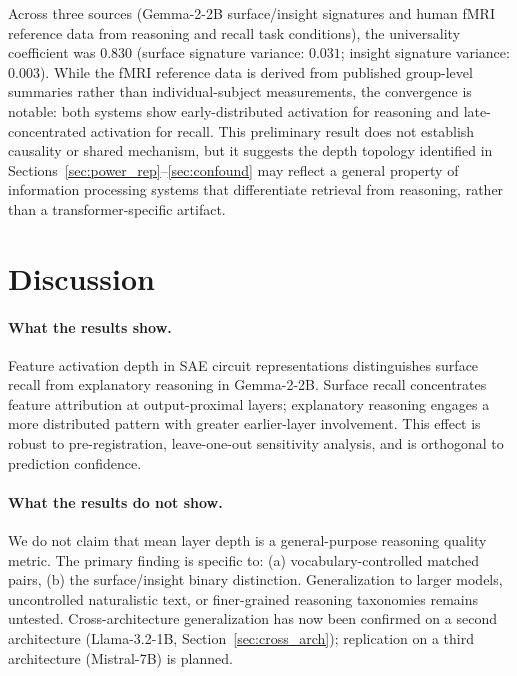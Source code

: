 \documentclass[10pt]{article}
\begin{document}
Across three sources (Gemma-2-2B surface/insight signatures and human fMRI reference data from reasoning and recall task conditions), the universality coefficient was $0.830$ (surface signature variance: $0.031$; insight signature variance: $0.003$). While the fMRI reference data is derived from published group-level summaries rather than individual-subject measurements, the convergence is notable: both systems show early-distributed activation for reasoning and late-concentrated activation for recall. This preliminary result does not establish causality or shared mechanism, but it suggests the depth topology identified in Sections~\ref{sec:power_rep}--\ref{sec:confound} may reflect a general property of information processing systems that differentiate retrieval from reasoning, rather than a transformer-specific artifact.

\section{Discussion}

\paragraph{What the results show.}
Feature activation depth in SAE circuit representations distinguishes surface recall from explanatory reasoning in Gemma-2-2B. Surface recall concentrates feature attribution at output-proximal layers; explanatory reasoning engages a more distributed pattern with greater earlier-layer involvement. This effect is robust to pre-registration, leave-one-out sensitivity analysis, and is orthogonal to prediction confidence.

\paragraph{What the results do not show.}
We do not claim that mean layer depth is a general-purpose reasoning quality metric. The primary finding is specific to: (a) vocabulary-controlled matched pairs, (b) the surface/insight binary distinction. Generalization to larger models, uncontrolled naturalistic text, or finer-grained reasoning taxonomies remains untested. Cross-architecture generalization has now been confirmed on a second architecture (Llama-3.2-1B, Section~\ref{sec:cross_arch}); replication on a third architecture (Mistral-7B) is planned.
\end{document}

